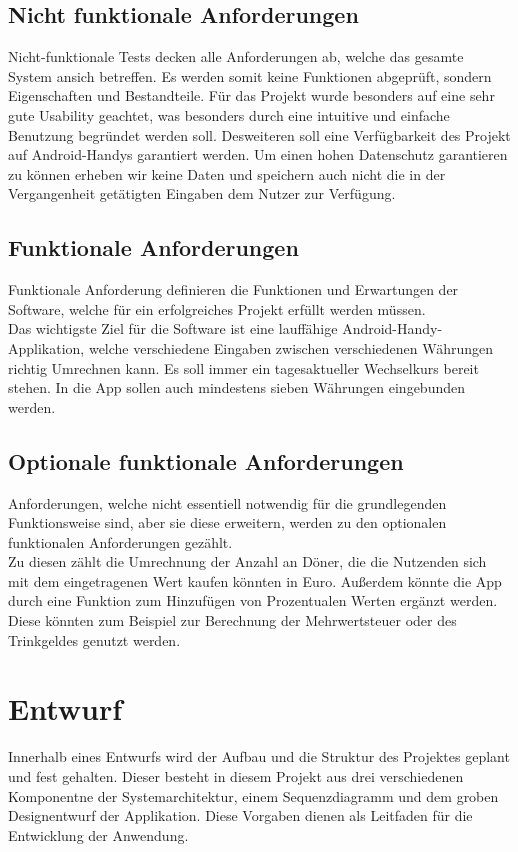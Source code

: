 \documentclass[conference]{IEEEtran}
\begin{document}
\subsection{Nicht funktionale Anforderungen}
Nicht-funktionale Tests decken alle Anforderungen ab, welche das gesamte System ansich betreffen. Es werden somit keine Funktionen abgeprüft, sondern Eigenschaften und Bestandteile. Für das Projekt wurde besonders auf eine sehr gute Usability geachtet, was besonders durch eine intuitive und einfache Benutzung begründet werden soll.
Desweiteren soll eine Verfügbarkeit des Projekt auf Android-Handys garantiert werden. Um einen hohen Datenschutz garantieren zu können erheben wir keine Daten und speichern auch nicht die in der Vergangenheit getätigten Eingaben dem Nutzer zur Verfügung. 

\subsection{Funktionale Anforderungen}
Funktionale Anforderung definieren die Funktionen und Erwartungen der Software, welche für ein erfolgreiches Projekt erfüllt werden müssen. \\
Das wichtigste Ziel für die Software ist eine lauffähige Android-Handy-Applikation, welche verschiedene Eingaben zwischen verschiedenen Währungen richtig Umrechnen kann. Es soll immer ein tagesaktueller Wechselkurs bereit stehen. In die App sollen auch mindestens sieben Währungen eingebunden werden.

\subsection{Optionale funktionale Anforderungen}
Anforderungen, welche nicht essentiell notwendig für die grundlegenden Funktionsweise sind, aber sie diese erweitern, werden zu den optionalen funktionalen Anforderungen gezählt. \\
Zu diesen zählt die Umrechnung der Anzahl an Döner, die die Nutzenden sich mit dem eingetragenen Wert kaufen könnten in Euro. Außerdem könnte die App durch eine Funktion zum Hinzufügen von Prozentualen Werten ergänzt werden. Diese könnten zum Beispiel zur Berechnung der Mehrwertsteuer oder des Trinkgeldes genutzt werden.

\section{Entwurf}
Innerhalb eines Entwurfs wird der Aufbau und die Struktur des Projektes geplant und fest gehalten. Dieser besteht in diesem Projekt aus drei verschiedenen Komponentne der Systemarchitektur, einem Sequenzdiagramm und dem groben Designentwurf der Applikation. Diese Vorgaben dienen als Leitfaden für die Entwicklung der Anwendung.
\end{document}
